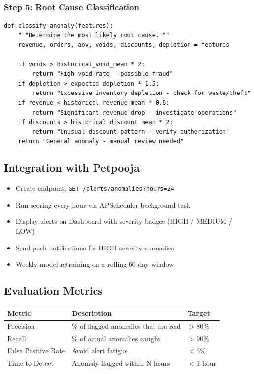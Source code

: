 \documentclass[12pt, a4paper]{article}
\begin{document}
\subsubsection{Step 5: Root Cause Classification}
\begin{lstlisting}
def classify_anomaly(features):
    """Determine the most likely root cause."""
    revenue, orders, aov, voids, discounts, depletion = features
    
    if voids > historical_void_mean * 2:
        return "High void rate - possible fraud"
    if depletion > expected_depletion * 1.5:
        return "Excessive inventory depletion - check for waste/theft"
    if revenue < historical_revenue_mean * 0.6:
        return "Significant revenue drop - investigate operations"
    if discounts > historical_discount_mean * 2:
        return "Unusual discount pattern - verify authorization"
    return "General anomaly - manual review needed"
\end{lstlisting}


\subsection{Integration with Petpooja}
\begin{itemize}[nosep]
    \item Create endpoint: \texttt{GET /alerts/anomalies?hours=24}
    \item Run scoring every hour via APScheduler background task
    \item Display alerts on Dashboard with severity badges (HIGH / MEDIUM / LOW)
    \item Send push notifications for HIGH severity anomalies
    \item Weekly model retraining on a rolling 60-day window
\end{itemize}


\subsection{Evaluation Metrics}
\begin{center}
\begin{tabular}{lll}
\toprule
\textbf{Metric} & \textbf{Description} & \textbf{Target} \\
\midrule
Precision        & \% of flagged anomalies that are real     & $> 80\%$ \\
Recall           & \% of actual anomalies caught             & $> 90\%$ \\
False Positive Rate & Avoid alert fatigue                   & $< 5\%$ \\
Time to Detect   & Anomaly flagged within N hours           & $< 1$ hour \\
\bottomrule
\end{tabular}
\end{center}
\end{document}
